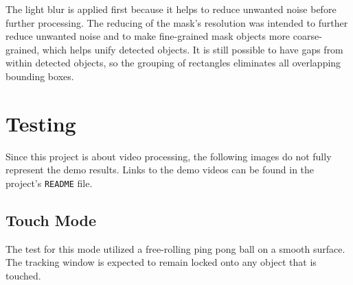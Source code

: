 \documentclass[11pt,letterpaper]{article}
\begin{document}
	The light blur is applied first because it helps to reduce unwanted noise before further processing. The reducing of the mask's resolution was intended to further reduce unwanted noise and to make fine-grained mask objects more coarse-grained, which helps unify detected objects. It is still possible to have gaps from within detected objects, so the grouping of rectangles eliminates all overlapping bounding boxes.
    
    
    \newpage
	\section{Testing}
	
	Since this project is about video processing, the following images do not fully represent the demo results. Links to the demo videos can be found in the project's {\tt README} file.
	
	\subsection*{Touch Mode}
	The test for this mode utilized a free-rolling ping pong ball on a smooth surface. The tracking window is expected to remain locked onto any object that is touched.  \\
	
\end{document}
